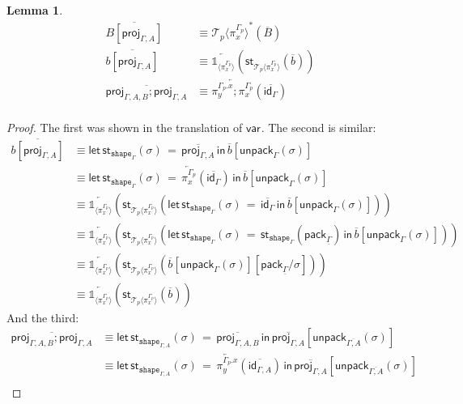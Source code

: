 \documentclass[10pt]{article}
\newtheorem{lemma}{Lemma}
\theoremstyle{definition}
\newcommand{\id}{\mathsf{id}}
\newcommand{\rewrite}[2]{\overleftarrow{#1}(#2)}
\newcommand\St[2]{\ensuremath{{#1}^*(#2)}}
\newcommand\StI[2]{\ensuremath{\mathsf{st}_{#1}(#2)}}
\newcommand\StE[4]{\ensuremath{\mathsf{let} \, \StI{#1}{#3} \, = \, {#2} \, \mathsf{in} \, #4}}
\newcommand\ApEl[2]{\mathcal{T}_{#1}\langle#2\rangle}
\newcommand\pack[1]{\ensuremath{\mathsf{pack}_{#1}}}
\newcommand\unpack[2]{\ensuremath{\mathsf{unpack}_{#1}(#2)}}
\newcommand{\modeof}[1]{{#1}_p}
\newcommand{\tshape}[1]{\ensuremath{\mathtt{shape}_{#1}}}
\newcommand{\upstairs}[1]{\overline{#1}}
\newcommand{\downstairs}[1]{\underline{#1}}
\newcommand\proj[1]{\ensuremath{\mathsf{proj}_{#1}}}
\newcommand\qvar[1]{\ensuremath{\mathsf{var}_{#1}}}
\newcommand\One{\ensuremath{\mathds{1}}}
\newcommand\ApOne[1]{\ensuremath{\One_{\langle {#1} \rangle }}}
\begin{document}
\begin{lemma}
\begin{align*}
\upstairs{B[\proj{\Gamma, A}]} &\equiv \St{\ApEl{p}{\pi^{\modeof{\Gamma}}_x}}{\upstairs{B}} \\
\upstairs{b[\proj{\Gamma, A}]} &\equiv \rewrite{\ApOne{\pi^{\modeof{\Gamma}}_x}}{\StI{\ApEl{p}{\pi^{\modeof{\Gamma}}_x}}{\upstairs{b}}} \\
\upstairs{\proj{\Gamma, A, B};\proj{\Gamma, A}} &\equiv \rewrite{\pi^{\modeof{\Gamma}.x}_y;\pi^{\modeof{\Gamma}}_x}{\upstairs{\id_{\Gamma}}} \\
\end{align*}
\end{lemma}
\begin{proof}
The first was shown in the translation of $\qvar{}$. The second is similar:
\begin{align*}
\upstairs{b[\proj{\Gamma, A}]}
&\equiv \StE{\tshape{\Gamma}}{\upstairs{\proj{\Gamma, A}}}{\sigma}{\upstairs{b}[\unpack{\Gamma}{\sigma}]} \\
&\equiv \StE{\tshape{\Gamma}}{\rewrite{\pi^{\modeof{\Gamma}}_x}{\upstairs{\id_\Gamma}}}{\sigma}{\upstairs{b}[\unpack{\Gamma}{\sigma}]} \\
&\equiv \rewrite{\ApOne{\pi^{\modeof{\Gamma}}_x}}{\StI{\ApEl{p}{\pi^{\modeof{\Gamma}}_x}}{\StE{\tshape{\Gamma}}{\upstairs{\id_\Gamma}}{\sigma}{\upstairs{b}[\unpack{\Gamma}{\sigma}]}}} \\
&\equiv \rewrite{\ApOne{\pi^{\modeof{\Gamma}}_x}}{\StI{\ApEl{p}{\pi^{\modeof{\Gamma}}_x}}{\StE{\tshape{\Gamma}}{\StI{\tshape{\Gamma}}{\pack{\downstairs{\Gamma}}}}{\sigma}{\upstairs{b}[\unpack{\Gamma}{\sigma}]}}} \\
&\equiv \rewrite{\ApOne{\pi^{\modeof{\Gamma}}_x}}{\StI{\ApEl{p}{\pi^{\modeof{\Gamma}}_x}}{\upstairs{b}[\unpack{\Gamma}{\sigma}][\pack{\downstairs{\Gamma}}/\sigma]}} \\
&\equiv \rewrite{\ApOne{\pi^{\modeof{\Gamma}}_x}}{\StI{\ApEl{p}{\pi^{\modeof{\Gamma}}_x}}{\upstairs{b}}}
\end{align*}
And the third:
\begin{align*}
\upstairs{\proj{\Gamma, A, B};\proj{\Gamma, A}} 
&\equiv \StE{\tshape{\Gamma, A}}{\upstairs{\proj{\Gamma, A, B}}}{\sigma}{\upstairs{\proj{\Gamma, A}}[\unpack{\upstairs{\Gamma, A}}{\sigma}]} \\
&\equiv \StE{\tshape{\Gamma, A}}{\rewrite{\pi^{\modeof{\Gamma}.x}_y}{\upstairs{\id_{\Gamma, A}}}}{\sigma}{\upstairs{\proj{\Gamma, A}}[\unpack{\upstairs{\Gamma, A}}{\sigma}]} \\

\end{align*}
\end{proof}
\end{document}
